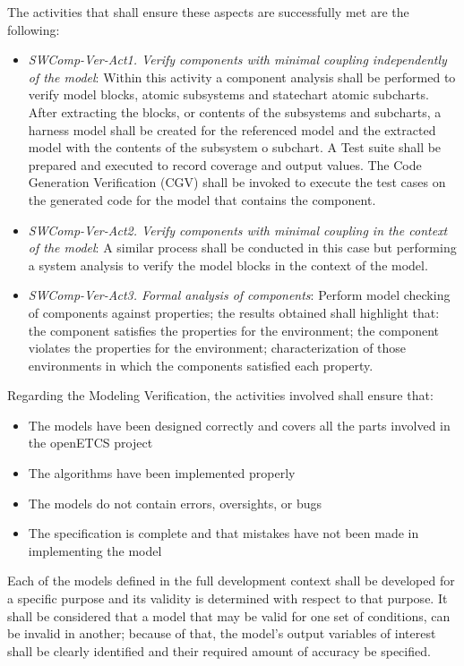 The activities that shall ensure these aspects are successfully met
are the following:
\begin{itemize}
\item {\it SWComp-Ver-Act1. Verify components with minimal coupling
    independently of the model}: Within this activity a component
  analysis shall be performed to verify model blocks, atomic
  subsystems and statechart atomic subcharts. After extracting the
  blocks, or contents of the subsystems and subcharts, a harness model
  shall be created for the referenced model and the extracted model
  with the contents of the subsystem o subchart. A Test suite shall be
  prepared and executed to record coverage and output values. The Code
  Generation Verification (CGV) shall be invoked to execute the test
  cases on the generated code for the model that contains the
  component.
\item {\it SWComp-Ver-Act2. Verify components with minimal coupling in
    the context of the model}: A similar process shall be conducted in
  this case but performing a system analysis to verify the model
  blocks in the context of the model.
\item {\it SWComp-Ver-Act3. Formal analysis of components}: Perform
  model checking of components against properties; the results
  obtained shall highlight that: the component satisfies the
  properties for the environment; the component violates the
  properties for the environment; characterization of those
  environments in which the components satisfied each property.
\end{itemize}

Regarding the Modeling Verification, the activities involved shall ensure that:
\begin{itemize}
\item The models have been designed correctly and covers all the parts
  involved in the openETCS project
\item The algorithms have been implemented properly
\item The models do not contain errors, oversights, or bugs
\item The specification is complete and that mistakes have not been
  made in implementing the model
\end{itemize}

Each of the models defined in the full development context shall be
developed for a specific purpose and its validity is determined with
respect to that purpose. It shall be considered that a model that may
be valid for one set of conditions, can be invalid in another; because
of that, the model's output variables of interest shall be clearly
identified and their required amount of accuracy be specified.

